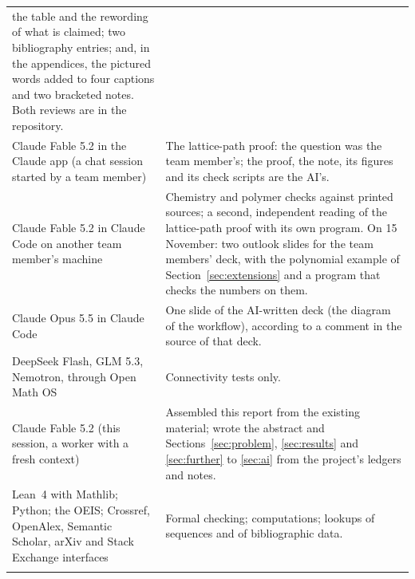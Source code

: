 \documentclass[11pt]{article}
\theoremstyle{definition}
\theoremstyle{remark}
\numberwithin{equation}{section}
\numberwithin{figure}{section}
\begin{document}
{\begin{longtable}{@{}>{\raggedright\arraybackslash}p{}>{\raggedright\arraybackslash}p{}@{}}
 the table and the rewording of what is claimed; two bibliography entries; and, in the appendices, the
 pictured words added to four captions and two bracketed notes. Both reviews are in the
 repository.\\\addlinespace[3pt]
Claude Fable 5.2 in the Claude app (a chat session started by a team member) & The lattice-path proof: the
 question was the team member's; the proof, the note, its figures and its check scripts are the AI's.\\\addlinespace[3pt]
Claude Fable 5.2 in Claude Code on another team member's machine & Chemistry and polymer checks against
 printed sources; a second, independent reading of the lattice-path proof with its own program. On
 15 November: two outlook slides for the team members' deck, with the polynomial example of
 Section~\ref{sec:extensions} and a program that checks the numbers on them.\\\addlinespace[3pt]
Claude Opus 5.5 in Claude Code & One slide of the AI-written deck (the diagram of the workflow), according to
 a comment in the source of that deck.\\\addlinespace[3pt]
DeepSeek Flash, GLM 5.3, Nemotron, through Open Math OS & Connectivity tests only.\\\addlinespace[3pt]
Claude Fable 5.2 (this session, a worker with a fresh context) & Assembled this report from the existing
 material; wrote the abstract and Sections~\ref{sec:problem}, \ref{sec:results} and \ref{sec:further} to
 \ref{sec:ai} from the project's ledgers and notes.\\\addlinespace[3pt]
Lean~4 with Mathlib; Python; the OEIS; Crossref, OpenAlex, Semantic Scholar, arXiv and Stack Exchange
 interfaces & Formal checking; computations; lookups of sequences and of bibliographic data.\\\addlinespace[3pt]
\end{longtable}}
\end{document}
